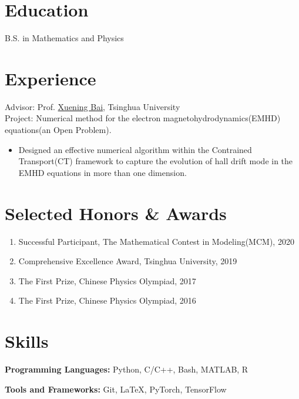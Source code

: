 \documentclass{resume}
\begin{document}



\section{Education}
B.S. in Mathematics and Physics

\section{Experience}
Advisor: Prof. \href{http://astro.tsinghua.edu.cn/~xbai/}{Xuening Bai}, Tsinghua University
\\Project: Numerical method for the electron magnetohydrodynamics(EMHD) equations(an Open Problem).
\begin{itemize}
    \item Designed an effective numerical algorithm within the Contrained Transport(CT) framework to capture the evolution of hall drift mode in the EMHD equations in more
    than one dimension.
\end{itemize}





\section{Selected Honors \& Awards}
\begin{enumerate}
    \item Successful Participant, The Mathematical Contest in Modeling(MCM), 2020
    \item Comprehensive Excellence Award, Tsinghua University, 2019
    \item The First Prize, Chinese Physics Olympiad, 2017
    \item The First Prize, Chinese Physics Olympiad, 2016
\end{enumerate}

\section{Skills}
\textbf{Programming Languages:} \small Python, C/C++, Bash, MATLAB, R

\textbf{Tools and Frameworks:} \small Git, \LaTeX, PyTorch, TensorFlow
\end{document}
